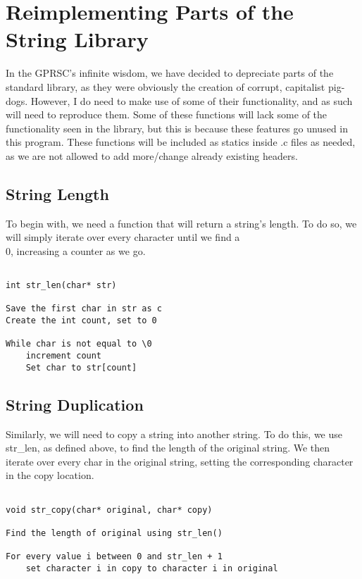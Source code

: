 \documentclass[11pt]{article}
\begin{document}
\section{Reimplementing Parts of the String Library}

In the GPRSC's infinite wisdom, we have decided to depreciate parts of the standard library, as they were obviously the creation of corrupt, capitalist pig-dogs. However, I do need to make use of some of their functionality, and as such will need to reproduce them. Some of these functions will lack some of the functionality seen in the library, but this is because these features go unused in this program. These functions will be included as statics inside .c files as needed, as we are not allowed to add more/change already existing headers.

\subsection{String Length}

To begin with, we need a function that will return a string's length. To do so, we will simply iterate over every character until we find a \\0, increasing a counter as we go.

\begin{verbatim}

int str_len(char* str)

Save the first char in str as c
Create the int count, set to 0

While char is not equal to \0
    increment count
    Set char to str[count]

\end{verbatim}

\subsection{String Duplication}

Similarly, we will need to copy a string into another string. To do this, we use str\_len, as defined above, to find the length of the original string. We then iterate over every char in the original string, setting the corresponding character in the copy location.

\begin{verbatim}

void str_copy(char* original, char* copy)

Find the length of original using str_len()

For every value i between 0 and str_len + 1
    set character i in copy to character i in original

\end{verbatim}
\end{document}
